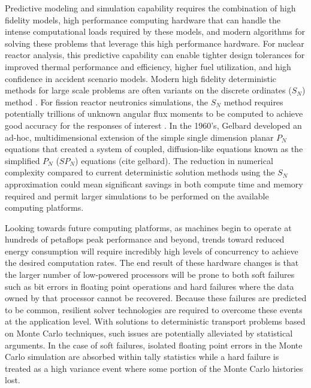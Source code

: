 \documentclass[letterpaper,11pt]{article}
\begin{document}
Predictive modeling and simulation capability requires the combination
of high fidelity models, high performance computing hardware that can
handle the intense computational loads required by these models, and
modern algorithms for solving these problems that leverage this high
performance hardware. For nuclear reactor analysis, this predictive
capability can enable tighter design tolerances for improved thermal
performance and efficiency, higher fuel utilization, and high
confidence in accident scenario models. Modern high fidelity
deterministic methods for large scale problems are often variants on
the discrete ordinates ($S_N$) method \cite{evans_denovo:_2010}. For
fission reactor neutronics simulations, the $S_N$ method requires
potentially trillions of unknown angular flux moments to be computed
to achieve good accuracy for the responses of interest
\cite{slaybaugh_acceleration_2011}. In the 1960's, Gelbard developed
an ad-hoc, multidimensional extension of the simple single dimension
planar $P_N$ equations that created a system of coupled,
diffusion-like equations known as the simplified $P_N$ ($SP_N$)
equations (cite gelbard). The reduction in numerical complexity
compared to current deterministic solution methods using the $S_N$
approximation could mean significant savings in both compute time and
memory required and permit larger simulations to be performed on the
available computing platforms.

Looking towards future computing platforms, as machines begin to
operate at hundreds of petaflops peak performance and beyond, trends
toward reduced energy consumption will require incredibly high levels
of concurrency to achieve the desired computation rates. The end
result of these hardware changes is that the larger number of
low-powered processors will be prone to both soft failures such as bit
errors in floating point operations and hard failures where the data
owned by that processor cannot be recovered. Because these failures
are predicted to be common, resilient solver technologies are required
to overcome these events at the application level. With solutions to
deterministic transport problems based on Monte Carlo techniques, such
issues are potentially alleviated by statistical arguments. In the
case of soft failures, isolated floating point errors in the Monte
Carlo simulation are absorbed within tally statistics while a hard
failure is treated as a high variance event where some portion of the
Monte Carlo histories lost.
\end{document}
